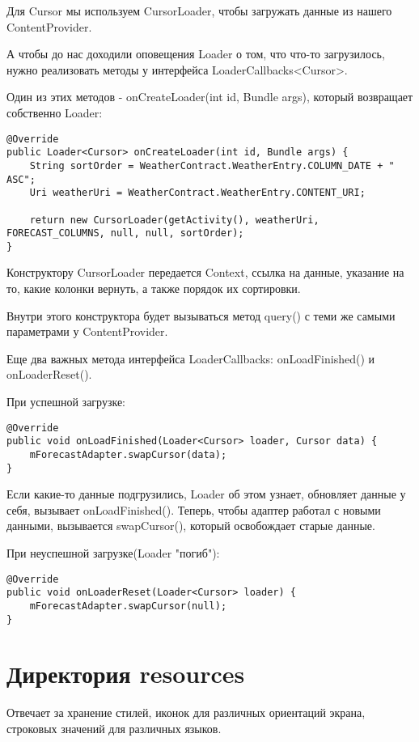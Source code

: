 \documentclass[12 pt]{article}
\begin{document}
    Для Cursor мы используем CursorLoader, чтобы загружать данные из нашего ContentProvider.
    
    А чтобы до нас доходили оповещения Loader о том, что что-то загрузилось, нужно реализовать методы у интерфейса LoaderCallbacks<Cursor>.
    
    Один из этих методов - onCreateLoader(int id, Bundle args), который возвращает собственно Loader:
    
    \begin{lstlisting}
@Override
public Loader<Cursor> onCreateLoader(int id, Bundle args) {
	String sortOrder = WeatherContract.WeatherEntry.COLUMN_DATE + " ASC";
	Uri weatherUri = WeatherContract.WeatherEntry.CONTENT_URI;

	return new CursorLoader(getActivity(), weatherUri, FORECAST_COLUMNS, null, null, sortOrder);
}
    \end{lstlisting}

Конструктору CursorLoader передается Context, ссылка на данные, указание на то, какие колонки вернуть, а также порядок их сортировки.

Внутри этого конструктора будет вызываться метод query() с теми же самыми параметрами у ContentProvider.

Еще два важных метода интерфейса LoaderCallbacks: onLoadFinished() и onLoaderReset().

При успешной загрузке:

	\begin{lstlisting}
@Override
public void onLoadFinished(Loader<Cursor> loader, Cursor data) {
	mForecastAdapter.swapCursor(data);
}
    \end{lstlisting}
Если какие-то данные подгрузились, Loader об этом узнает, обновляет данные у себя, вызывает onLoadFinished(). Теперь, чтобы адаптер работал с новыми данными, вызывается swapCursor(), который освобождает старые данные.    

При неуспешной загрузке(Loader "погиб"):

	\begin{lstlisting}
@Override
public void onLoaderReset(Loader<Cursor> loader) {
	mForecastAdapter.swapCursor(null);
}
    \end{lstlisting}

\section{Директория resources}
Отвечает за хранение стилей, иконок для различных ориентаций экрана, строковых значений для различных языков.
\end{document}

